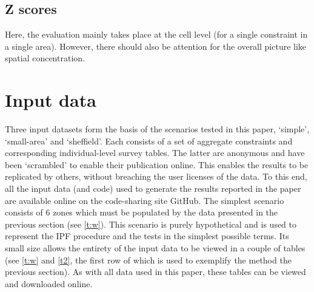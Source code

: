 \documentclass[a4paper,10pt]{article}
\begin{document}
\subsection{Z scores}
Here, the evaluation mainly takes place at the cell level (for a single constraint in a single area).
However, there should also be attention for the overall picture like spatial concentration.


\section{Input data}
Three input datasets form the basis of the scenarios tested in this paper,
`simple', `small-area' and `sheffield'. Each consists of a set of aggregate
constraints and corresponding individual-level survey tables.
The latter are anonymous and have been `scrambled' to enable their
publication online. This enables the results to be replicated by others,
without breaching the user licenses of the data.
To this end, all the input data (and code) used to generate the results reported
in the paper are available online on the code-sharing site GitHub.
The simplest scenario consists of 6 zones which must be populated by the
data presented in the previous section (see \cref{t:w}).
This scenario is purely hypothetical and is used to represent the IPF procedure
and the tests in the simplest possible terms. Its small size allows the entirety
of the input data to be viewed in a couple of tables 
(see \cref{t:w} and \cref{t2}, the first row of which is used
to exemplify the method the previous section). As with all
data used in this paper, these tables can be
viewed and downloaded online.

\end{document}
